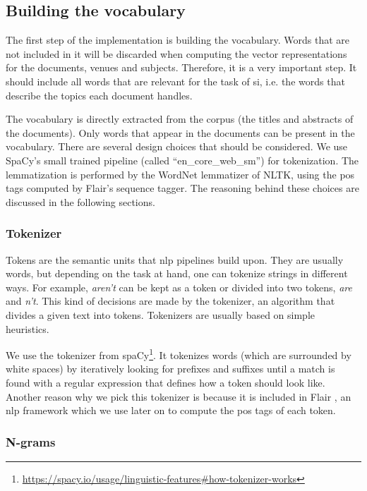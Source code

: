 \subsection{Building the vocabulary} \label{implementation_vocab}

The first step of the implementation is building the vocabulary. Words that are not included in it will be discarded when computing the vector representations for the documents, venues and subjects. Therefore, it is a very important step. It should include all words  that are relevant for the task of \acrshort{si}, i.e. the words that describe the topics each document handles.

The vocabulary is directly extracted from the corpus (the titles and abstracts of the documents). Only words that appear in the documents can be present in the vocabulary. There are several design choices that should be considered. We use SpaCy's small trained pipeline (called ``en\_core\_web\_sm'') for tokenization. The lemmatization is performed by the WordNet lemmatizer of NLTK, using the \acrfull{pos} tags computed by Flair's sequence tagger. The reasoning behind these choices are discussed in the following sections.

\subsubsection{Tokenizer}

Tokens are the semantic units that \acrfull{nlp} pipelines build upon. They are usually words, but depending on the task at hand, one can tokenize strings in different ways. For example, \textit{aren't} can be kept as a token or divided into two tokens, \textit{are} and \textit{n't}. This kind of decisions are made by the tokenizer, an algorithm that divides a given text into tokens. Tokenizers are usually based on simple heuristics.

We use the tokenizer from spaCy\footnote{\url{https://spacy.io/usage/linguistic-features\#how-tokenizer-works}}. It tokenizes words (which are surrounded by white spaces) by iteratively looking for prefixes and suffixes until a match is found with a regular expression that defines how a token should look like. Another reason why we pick this tokenizer is because it is included in Flair \cite{akbik2019flair}, an \acrshort{nlp} framework which we use later on to compute the \acrshort{pos} tags of each token.

\subsubsection{N-grams} \label{vocab_ngrams}

